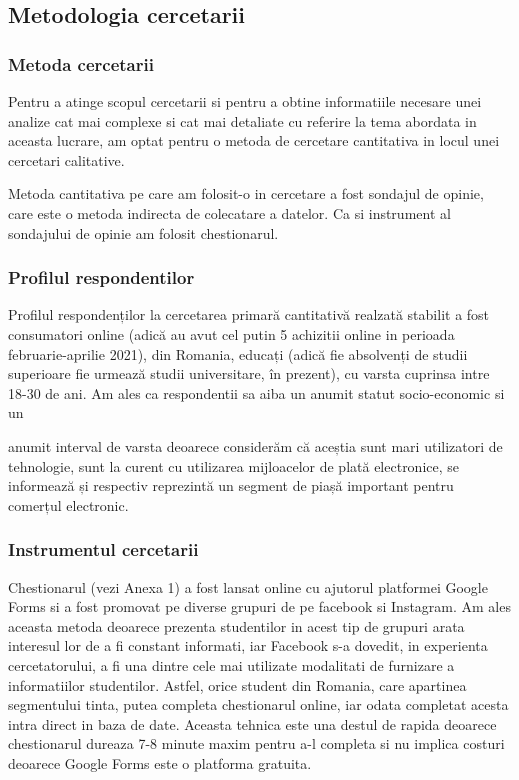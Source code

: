 \documentclass[a4paper, 12pt]{article}
\begin{document}
	\subsection{Metodologia cercetarii}
	\subsubsection{Metoda cercetarii}
	\qquad Pentru a atinge scopul cercetarii si pentru a obtine informatiile necesare unei analize cat mai complexe si cat mai detaliate cu referire la tema abordata in aceasta lucrare, am optat pentru o metoda de cercetare cantitativa in locul unei cercetari calitative.
	
	\quad Metoda cantitativa pe care am folosit-o in cercetare a fost sondajul de opinie, care este o metoda indirecta de colecatare a datelor. Ca si instrument al sondajului de opinie am folosit chestionarul.
	\subsubsection{Profilul respondentilor}
	\qquad Profilul respondenților la cercetarea primară cantitativă realzată stabilit a fost consumatori online (adică au avut cel putin 5 achizitii online in perioada februarie-aprilie 2021), din Romania, educați (adică fie absolvenți de studii superioare fie urmează studii universitare, în prezent), cu varsta cuprinsa intre 18-30 de ani. Am ales ca respondentii sa aiba un anumit statut socio-economic si un
	
	anumit interval de varsta deoarece considerăm că aceștia sunt mari utilizatori de tehnologie, sunt la curent cu utilizarea mijloacelor de plată electronice, se informează și respectiv reprezintă un segment de piașă important pentru comerțul electronic.
	\subsubsection{Instrumentul cercetarii}
		\qquad  Chestionarul (vezi Anexa 1) a fost lansat online cu ajutorul platformei Google Forms si a fost promovat  pe diverse grupuri de pe facebook si Instagram. Am ales aceasta metoda deoarece prezenta studentilor in acest tip de grupuri arata interesul lor de a fi constant informati, iar Facebook s-a dovedit, in experienta cercetatorului, a fi una dintre cele mai utilizate modalitati de furnizare a informatiilor studentilor. Astfel, orice student din Romania, care apartinea segmentului tinta, putea completa chestionarul online, iar odata completat acesta intra direct in baza de date. Aceasta tehnica este una destul de rapida deoarece chestionarul dureaza 7-8 minute maxim pentru a-l completa si nu implica costuri deoarece Google Forms este o platforma gratuita.
\end{document}
